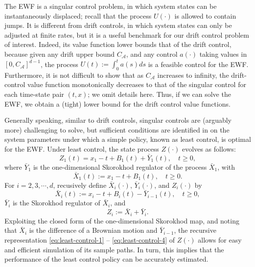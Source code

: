 \documentclass[11pt]{article}
\theoremstyle{definition}
\theoremstyle{plain}
\begin{document}
The EWF is a singular control problem, in which system states can be instantaneously displaced; 
recall that the process $U(\cdot)$ is allowed to contain jumps. 
It is different from drift controls, in which system states can only be adjusted at finite rates, 
but it is a useful benchmark for our drift control problem of interest. 
Indeed, its value function lower bounds that of the drift control,  
because given any drift upper bound $C_{\mathcal{A}}$, and any control $a(\cdot)$ taking values in $[0, C_{\mathcal{A}}]^{d-1}$, 
the process $U(t):=\int_0^t a(s) ds$ is a feasible control for the EWF.
Furthermore, it is not difficult to show that as $C_{\mathcal{A}}$ increases to infinity, 
the drift-control value function monotonically decreases to that of the singular control for each time-state pair $(t,x)$; we omit details here.
Thus, if we can solve the EWF, we obtain a (tight) lower bound for the drift control value functions.

Generally speaking, similar to drift controls, singular controls are (arguably more) challenging to solve, 
but sufficient conditions are identified in \cite{PesicWilliams2016} on the system parameters 
under which a simple policy, known as least control, is optimal for the EWF. 
Under least control, the state process $Z(\cdot)$ evolves as follows:
\begin{equation}\label{eq:least-control-1}
Z_1(t) = x_1 - t + B_1(t) + \bar Y_1(t), \quad t\geq 0,
\end{equation}
where $\bar Y_1$ is the one-dimensional Skorokhod regulator of the process $\bar X_1$, with
\begin{equation}\label{eq:least-control-2}
  \bar X_1(t) := x_1 - t + B_1(t), \quad t\geq 0.
\end{equation}
For $i = 2, 3, \cdots, d$, 
recusively define $\bar X_i(\cdot)$, $\bar Y_i(\cdot)$, and $Z_i(\cdot)$ by 
\begin{equation}\label{eq:least-control-3}
  \bar X_i(t) := x_i - t + B_i(t) - \bar Y_{i-1}(t), \quad t\geq 0, 
\end{equation}
$\bar Y_i$ is the Skorokhod regulator of $\bar X_i$, and 
\begin{equation}\label{eq:least-control-4}
  Z_i := \bar X_i + \bar Y_i.
\end{equation}
Exploiting the closed form of the one-dimensional Skorokhod map, and noting that $\bar X_i$ is the difference of a Brownian motion and $\bar Y_{i-1}$, 
the recursive representation \eqref{eq:least-control-1} -- \eqref{eq:least-control-4} of $Z(\cdot)$ allows for easy and efficient simulation 
of its sample paths. In turn, this implies that the performance of the least control policy can be accurately estimated.
\end{document}
